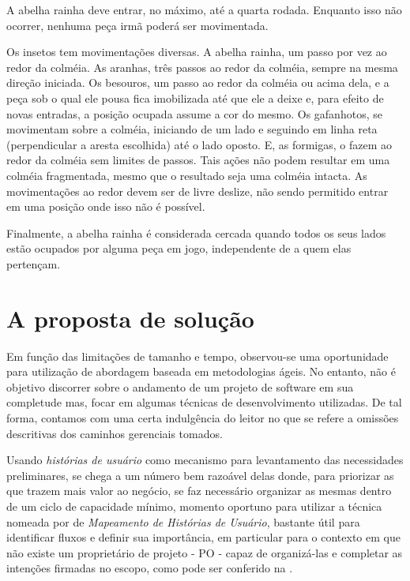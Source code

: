     A abelha rainha deve entrar, no máximo, até a quarta rodada. Enquanto isso não ocorrer, nenhuma peça irmã poderá ser movimentada.

    Os insetos tem movimentações diversas. A abelha rainha, um passo por vez ao redor da colméia. As aranhas, três passos ao redor da colméia, sempre na mesma direção iniciada. Os besouros, um passo ao redor da colméia ou acima dela, e a peça sob o qual ele pousa fica imobilizada até que ele a deixe e, para efeito de novas entradas, a posição ocupada assume a cor do mesmo. Os gafanhotos, se movimentam sobre a colméia, iniciando de um lado e seguindo em linha reta (perpendicular a aresta escolhida) até o lado oposto. E,  as formigas, o fazem ao redor da colméia sem limites de passos. Tais ações não podem resultar em uma colméia fragmentada, mesmo que o resultado seja uma colméia intacta. As movimentações ao redor devem ser de livre deslize, não sendo permitido entrar em uma posição onde isso não é possível.

    Finalmente, a abelha rainha é considerada cercada quando todos os seus lados estão ocupados por alguma peça em jogo, independente de a quem elas pertençam.

\section{A proposta de solução}

  Em função das limitações de tamanho e tempo, observou-se uma oportunidade para utilização de abordagem baseada em metodologias ágeis. No entanto, não é objetivo discorrer sobre o andamento de um projeto de software em sua completude mas, focar em algumas técnicas de desenvolvimento utilizadas. De tal forma, contamos com uma certa indulgência do leitor no que se refere a omissões descritivas dos caminhos gerenciais tomados.

  Usando \emph{histórias de usuário} como mecanismo para levantamento das necessidades preliminares, se chega a um número bem razoável delas donde, para priorizar as que trazem mais valor ao negócio, se faz necessário organizar as mesmas dentro de um ciclo de capacidade mínimo, momento oportuno para utilizar a técnica nomeada por  de \emph{Mapeamento de Histórias de Usuário}, bastante útil para identificar fluxos e definir sua importância, em particular para o contexto em que não existe um proprietário de projeto - PO - capaz de organizá-las e completar as intenções firmadas no escopo, como pode ser conferido na .


